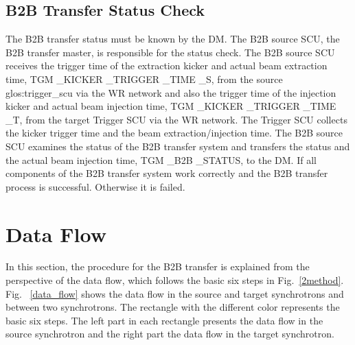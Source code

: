 %

\subsection{B2B Transfer Status Check}
The B2B transfer status must be known by the DM. The B2B source SCU, the B2B transfer master, is responsible for the status check. The B2B source SCU receives the trigger time of the extraction kicker and actual beam extraction time, TGM \_KICKER \_TRIGGER \_TIME \_S, from the source \gls{glos:trigger_scu} via the WR network and also the trigger time of the injection kicker and actual beam injection time, TGM \_KICKER \_TRIGGER \_TIME \_T, from the target Trigger SCU via the WR network. The Trigger SCU collects the kicker trigger time and the beam extraction/injection time. The B2B source SCU examines the status of the B2B transfer system and transfers the status and the actual beam injection time, TGM \_B2B \_STATUS, to the DM. If all components of the B2B transfer system work correctly and the B2B transfer process is successful. Otherwise it is failed. 
\section{Data Flow}
In this section, the procedure for the B2B transfer is explained from the perspective of the data flow, which follows the basic six steps in Fig.~\ref{2method}. Fig. ~\ref{data_flow} shows the data flow in the source and target synchrotrons and between two synchrotrons. The rectangle with the different color represents the basic six steps. The left part in each rectangle presents the data flow in the source synchrotron and the right part the data flow in the target synchrotron.


